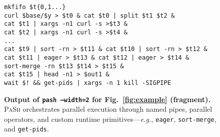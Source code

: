 \documentclass[sigplan, review, screen, anonymous]{acmart}
\newcommand{\eg}{{\em e.g.}, }
\newcommand{\ttiny}[1]{\texttt{#1}}
\newcommand{\sys}{{\scshape PaSh}\xspace}
\begin{document}

\begin{figure}[t]
\centering
\begin{verbatim}
mkfifo $t{0,1...}
curl $base/$y > $t0 & cat $t0 | split $t1 $t2 &
cat $t1 | xargs -n1 curl -s >$t3 & 
cat $t2 | xargs -n1 curl -s >$t4 &
...
cat $t9 | sort -rn > $t11 & cat $t10 | sort -rn > $t12 &
cat $t11 | eager > $t13 & cat $t12 | eager > $t14 &
sort-merge -rn $t13 $t14 > $t15 &
cat $t15 | head -n1 > $out1 &
wait $! && get-pids | xargs -n 1 kill -SIGPIPE
\end{verbatim}
\caption{
  \textbf{Output of \ttiny{pash --width=2} for Fig.~\ref{fig:example} (fragment).}
  \sys orchestrates parallel execution through named pipes, parallel operators, and custom runtime primitives---\eg \ttiny{eager}, \ttiny{sort-merge}, and \ttiny{get-pids}.
}
\vspace{-15pt}
\label{fig:example2}
\end{figure}
\end{document}
